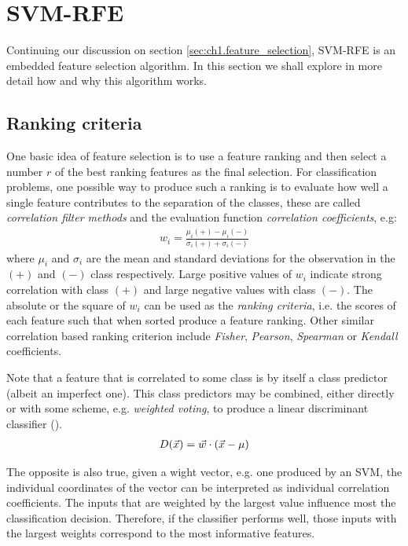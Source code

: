 \section{SVM-RFE}

Continuing our discussion on section \ref{sec:ch1.feature_selection}, SVM-RFE is an embedded feature se\-lec\-tion algorithm. In this section we shall explore in more detail how and why this algorithm works.

\subsection{Ranking criteria}
\label{sec:ch4.rfe.criteria}

One basic idea of feature selection is to use a feature ranking and then select a number $r$ of the best ranking features as the final selection. For classification prob\-lems, one possible way to produce such a ranking is to evaluate how well a single feature contributes to the separation of the classes, these are called \emph{correlation filter methods} and the evaluation function \emph{correlation coefficients}, e.g:
\begin{align*}
    w_i = \frac{\mu_i(+) - \mu_i(-)}{\sigma_i(+) + \sigma_i(-)} 
\end{align*}
where $\mu_i$ and $\sigma_i$ are the mean and standard deviations for the observation in the $(+)$ and $(-)$ class respectively. Large positive values of $w_i$ indicate strong correlation with class $(+)$ and large negative values with class $(-)$. The absolute or the square of $w_i$ can be used as the \emph{ranking criteria}, i.e. the scores of each feature such that when sorted produce a feature ranking. Other similar correlation based ranking criterion include \emph{Fisher}, \emph{Pearson}, \emph{Spearman} or \emph{Kendall} coefficients.

Note that a feature that is correlated to some class is by itself a class predictor (albeit an imperfect one). This class predictors may be combined, either directly or with some scheme, e.g. \emph{weighted voting}, to produce a linear discriminant classifier (\cite{guyon_gene_2002}).
\begin{align*}
    D(\vec{x}) = \vec{w} \cdot (\vec{x} - \mu) 
\end{align*}

The opposite is also true, given a wight vector, e.g. one produced by an SVM, the individual coordinates of the vector can be interpreted as individual correlation coefficients. The inputs that are weighted by the largest value influence most the classification decision. Therefore, if the classifier performs well, those inputs with the largest weights correspond to the most informative features.

